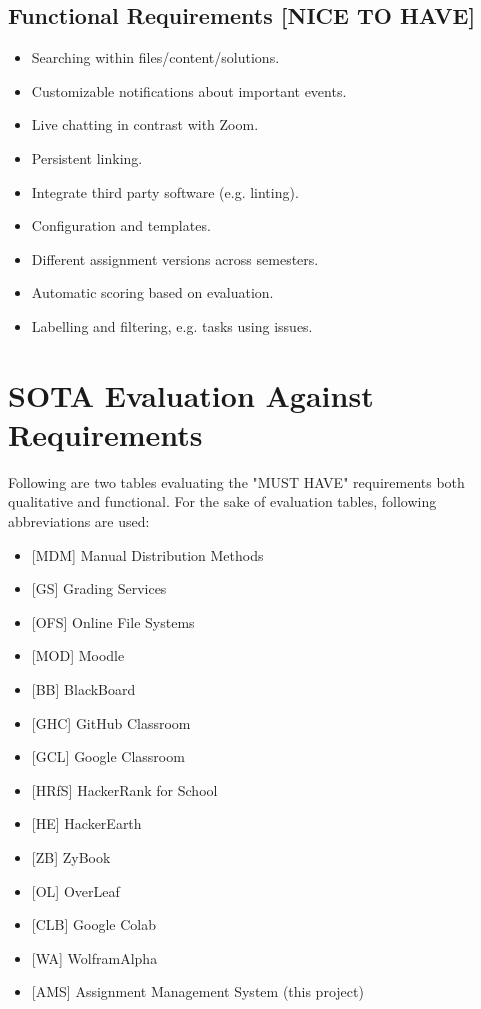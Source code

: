 \subsection{Functional Requirements {[}NICE TO HAVE{]}} \label{ssec:func-nth}

\begin{itemize}
\item
  {Searching within files/content/solutions.}
\item
  {Customizable notifications about important events.}
\item
  {Live chatting in contrast with Zoom.}
\item
  {Persistent linking.}
\item
  {Integrate third party software (e.g. linting).}
\item
  {Configuration and templates.}
\item
  {Different assignment versions across semesters.}
\item
  {Automatic scoring based on evaluation.}
\item
  {Labelling and filtering, e.g. tasks using issues.}
\end{itemize}

\section{SOTA Evaluation Against Requirements} \label{sec:eval}

{Following are two tables evaluating the "MUST HAVE" requirements both qualitative and functional. For the sake of evaluation tables, following abbreviations are used:}

\begin{itemize}
\item
  {{[}MDM{]} Manual Distribution Methods}
\item
  {{[}GS{]} Grading Services}
\item
  {{[}OFS{]} Online File Systems}
\item
  {{[}MOD{]} Moodle}
\item
  {{[}BB{]} BlackBoard}
\item
  {{[}GHC{]} GitHub Classroom}
\item
  {{[}GCL{]} Google Classroom}
\item
  {{[}HRfS{]} HackerRank for School}
\item
  {{[}HE{]} HackerEarth}
\item
  {{[}ZB{]} ZyBook}
\item
  {{[}OL{]} OverLeaf}
\item
  {{[}CLB{]} Google Colab}
\item
  {{[}WA{]} WolframAlpha}
\item
  {{[}AMS{]} Assignment Management System (this project)}
\end{itemize}

